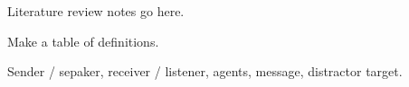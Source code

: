 Literature review notes go here.

Make a table of definitions.

Sender / sepaker, receiver / listener, agents, message, distractor target. 

